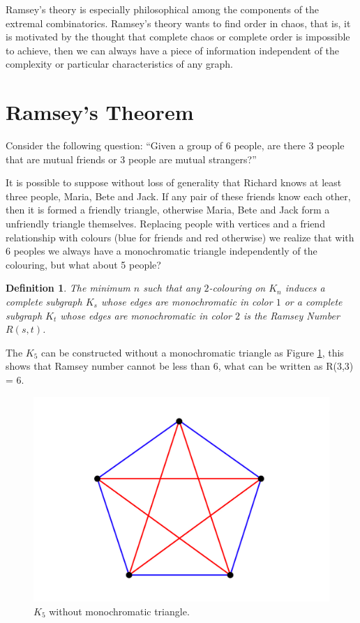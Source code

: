 \documentclass[12pt,twoside,a4paper]{book}
\numberwithin{equation}{section}
\newtheorem{definition}	[theorem] {Definition}
\theoremstyle{remark}
\begin{document}
Ramsey's theory is especially philosophical among the components of the extremal combinatorics. Ramsey's theory wants to find order in chaos, that is, it is motivated by the thought that complete chaos or complete order is impossible to achieve, then we can always have a piece of information independent of the complexity or particular characteristics of any graph.

\section{Ramsey's Theorem}
Consider the following question:
``Given a group of 6 people, are there 3 people that are mutual friends or 3 people are mutual strangers?''

It is possible to suppose without loss of generality that Richard knows at least three people, Maria, Bete and Jack. If any pair of these friends know each other, then it is formed a friendly triangle, otherwise Maria, Bete and Jack form a unfriendly triangle themselves. Replacing people with vertices and a friend relationship with colours (blue for friends and red otherwise) we realize that with 6 peoples we always have a monochromatic triangle independently of the colouring, but what about 5 people?

\begin{definition}\label{def:RamseyNumbers} 
The minimum $n$ such that any $2$-colouring on $K_n$ induces a complete subgraph $K_s$ whose edges are monochromatic in color $1$ or a complete subgraph $K_t$ whose edges are monochromatic in color $2$ is the Ramsey Number $R(s,t)$.
\end{definition}

The $K_5$ can be constructed without a monochromatic triangle as Figure \ref{fig:K5}, this shows that Ramsey number cannot be less than 6, what can be written as  R(3,3) = 6.

\begin{figure}[H]
     \centering
     \includegraphics[scale=1]{Figuras/K5-sem-triangulo.jpg}
     \caption{$K_5$ without monochromatic triangle.}
     \label{fig:K5}
\end{figure}
\end{document}
